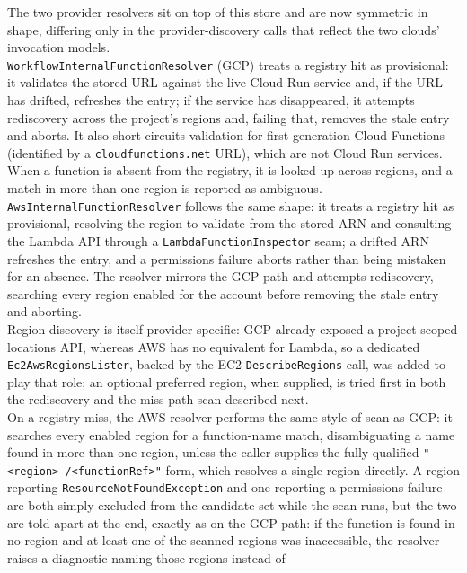 The two provider resolvers sit on top of this store and are now symmetric in shape, differing only
in the provider-discovery calls that reflect the two clouds' invocation models. \\
\texttt{WorkflowInternalFunctionResolver} (GCP) treats a registry hit as provisional: it
validates the stored URL against the live Cloud Run service and, if the URL has drifted, refreshes
the entry; if the service has disappeared, it attempts rediscovery across the project's regions
and, failing that, removes the stale entry and aborts. It also short-circuits validation for
first-generation Cloud Functions (identified by a \texttt{cloudfunctions.net} URL), which are not
Cloud Run services. When a function is absent from the registry, it is looked up across regions,
and a match in more than one region is reported as ambiguous.\\
\texttt{Aws\allowbreak Internal\allowbreak Function\allowbreak Resolver} follows the same shape: it treats a registry hit
as provisional, resolving the region to validate from the stored ARN and consulting the Lambda API
through a \texttt{Lambda\allowbreak Function\allowbreak Inspector} seam; a drifted ARN refreshes the entry, and a
permissions failure aborts rather than being mistaken for an absence. The resolver mirrors the GCP path and attempts
rediscovery, searching every region enabled for the account before removing the stale entry and
aborting. \\
Region discovery is itself provider-specific: GCP already exposed a project-scoped
locations API, whereas AWS has no equivalent for Lambda, so a dedicated
\texttt{Ec2Aws\allowbreak Regions\allowbreak Lister}, backed by the EC2 \texttt{DescribeRegions} call, was added to
play that role; an optional preferred region, when supplied, is tried first in both the
rediscovery and the miss-path scan described next. \\
On a registry miss, the AWS resolver performs
the same style of scan as GCP: it searches every enabled region for a function-name match,
disambiguating a name found in more than one region, unless the caller supplies the
fully-qualified \texttt{"<region> /<functionRef>"} form, which resolves a single region directly. A
region reporting \texttt{ResourceNotFoundException} and one reporting a permissions failure are
both simply excluded from the candidate set while the scan runs, but the two are told apart at the
end, exactly as on the GCP path: if the function is found in no region and at least one of the
scanned regions was inaccessible, the resolver raises a diagnostic naming those regions instead of
